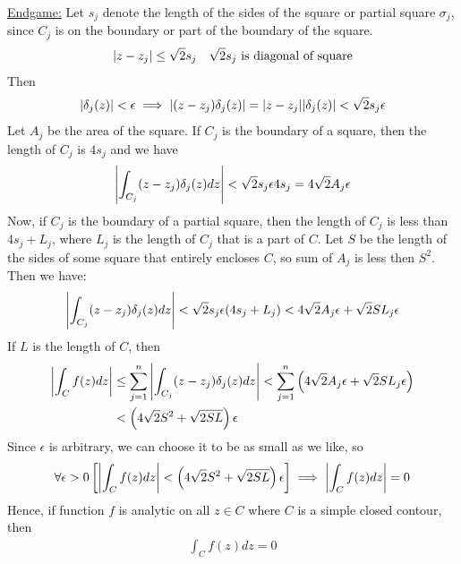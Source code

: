 \documentclass[12pt, english]{book}
\makeatletter
\renewenvironment{proof}[1][\proofname]{\par
	\pushQED{\qed}%
	\normalfont \topsep6\p@\@plus6\p@\relax
	\list{}{%
		\settowidth{\leftmargin}{\itshape\proofname:\hskip\labelsep}%
		\setlength{\labelwidth}{0pt}%
		\setlength{\itemindent}{-\leftmargin}%
		}%
	\item[\hskip\labelsep\itshape#1\@addpunct{:}]\ignorespaces
	}{\popQED\endlist\@endpefalse}
\makeatother
\begin{document}
\begin{proof}
		\underline{Endgame:} \newline \newline
		Let \(s_j\) denote the length of the sides of the square or partial square \(\sigma_j\), since \(C_j\) is on the boundary or part of the boundary of the square.
		\begin{align*}
			\abs{z - z_j} &\leq \sqrt{2} s_j & \sqrt{2} s_j \text{ is diagonal of square}
		\end{align*}
		Then 
		\begin{align*}
			\abs{\delta_j(z)} < \epsilon 
			\implies \abs{(z - z_j) \delta_j(z)} = \abs{z - z_j} \abs{\delta_j(z)} < \sqrt{2} s_j \epsilon
		\end{align*}
		Let \(A_j\) be the area of the square. If \(C_j\) is the boundary of a square, then the length of \(C_j\) is \(4s_j\)  and we have
		\begin{align*}
			\abs{\int_{C_j} (z - z_j) \delta_j (z) dz} < \sqrt{2}s_j \epsilon 4 s_j = 4\sqrt{2} A_j \epsilon
		\end{align*}
		Now, if \(C_j\) is the boundary of a partial square, then the length of \(C_j\) is less than \(4s_j + L_j\), where \(L_j\) is the length of \(C_j\) that is a part of \(C\). Let \(S\) be the length of the sides of some square that entirely encloses \(C\), so sum of \(A_j\) is less then \(S^2\). Then we have: 
		\begin{align*}
			\abs{\int_{C_j} (z - z_j) \delta_j(z) dz} < \sqrt{2} s_j \epsilon (4s_j + L_j) < 4 \sqrt{2} A_j \epsilon + \sqrt{2} SL_j \epsilon
		\end{align*}
		If \(L\) is the length of \(C\), then
		\begin{align*}
			\abs{\int_{C} f(z) dz} 
			&\leq \sum_{j=1}^{n} \abs{\int_{C_j} (z - z_j) \delta_j (z) dz} 
			< \sum_{j=1}^{n} \left( 4 \sqrt{2} A_j \epsilon + \sqrt{2} SL_j \epsilon \right) \\
			&< \left(4 \sqrt{2} S^2 + \sqrt{2 SL} \right) \epsilon
		\end{align*}
		Since \(\epsilon\) is arbitrary, we can choose it to be as small as we like, so 
		\begin{align*}
			\forall \epsilon > 0
			\left[\abs{\int_{C} f(z) dz} < \left(4 \sqrt{2} S^2 + \sqrt{2 SL} \right) \epsilon \right] \implies \abs{\int_{C} f(z) dz} = 0
		\end{align*}
		Hence, if function \(f\) is analytic on all \(z \in C\) where \(C\) is a simple closed contour, then
		\begin{align*}
			\int_{C} f(z) dz = 0
		\end{align*}
	

\end{proof}
\end{document}
